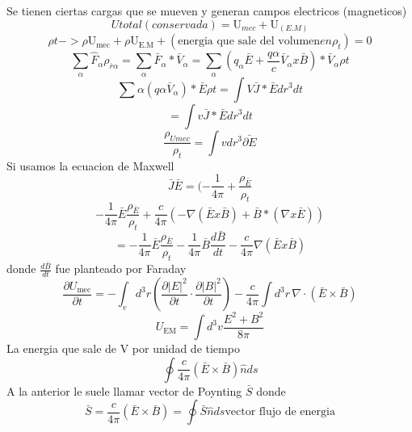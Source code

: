 \documentclass{article}
\begin{document}
	Se tienen ciertas cargas que se mueven y generan campos electricos (magneticos)
	\begin{equation*}
		U total (conservada)= \text{U}_{mec} + \text{U}_(E.M)
	\end{equation*}
	\begin{equation*}
		\rho t -> \rho \text{U}_{\text{mec}} + \rho \text{U}_{\text{E.M}} + (\text{energia que sale del volumen} en \rho_{t}) =0
	\end{equation*}
	\begin{equation*}
		\sum_{\alpha} \hat{F}_{\alpha} \rho_{\bar{r}\alpha}= \sum_{\alpha} \bar{F}_{\alpha} * \bar{V}_{\alpha}= \sum_{\alpha} (q_{\alpha} \bar{E} + \frac{q\alpha}{c} \bar{V}_{\alpha}x\bar{B})*\bar{V}_{\alpha} \rho t
	\end{equation*}
	\begin{equation*}
		\sum{\alpha} (q\alpha \bar{V}_{\alpha})*\bar{E} \rho t= \int{V} \bar{J} *\bar{E} dr^3 dt
	\end{equation*}
	\begin{equation*}
		= \int{v} \bar{J}*\bar{E} dr^3 dt
	\end{equation*}
	\begin{equation*}
		\frac{\rho_{Umec}}{\rho_{t}}=\int{v} dr^3 \bar{\partial E}
	\end{equation*}
	Si usamos la ecuacion de Maxwell
	\begin{equation*}
		\bar{J}\bar{E} = (-\frac{1}{4\pi}+\frac{\rho_{\bar{E}}}{\rho_{t}}
	\end{equation*}
	\begin{equation*}
		-\frac{1}{4\pi}\bar{E}\frac{\rho_{\bar{E}}}{\rho_{t}}  + \frac{c}{4\pi}(- \nabla (\bar{E}x\bar{B})+ \bar{B}*(\nabla x \bar{E}))
	\end{equation*}
	\begin{equation*}
		= -\frac{1}{4\pi}\bar{E}\frac{\rho_{\bar{E}}}{\rho_{t}} -\frac{1}{4\pi}\bar{B}\frac{d\bar{B}}{dt}-\frac{c}{4\pi}\nabla(\bar{E}x\bar{B})
	\end{equation*}
	donde \(\frac{d\bar{B}}{dt}\) fue planteado por Faraday
	\begin{equation}
		\frac{\partial U_{\text{mec}}}{\partial t} = - \int_{v} d^3r \left( \frac{\partial |E|^2}{\partial t} \cdot \frac{\partial |B|^2}{\partial t} \right) - \frac{c}{4\pi} \int d^3r \, \nabla \cdot \left( \bar{E} \times \bar{B} \right)
	\end{equation}
	\begin{equation*}
		U_{\text{EM}}= \int d^3v \frac{E^2 +B^2}{8\pi}
	\end{equation*}
	La energia que sale de V por unidad de tiempo
	\begin{equation*}
		\oint \frac{c}{4\pi}(\bar{E}\times\bar{B})\hat{n}ds
	\end{equation*}
	A la anterior le suele llamar vector de Poynting \(\bar{S}\)
	donde
	\begin{equation}
		\bar{S}=\frac{c}{4\pi}(\bar{E}\times\bar{B})= \oint \bar{S}\hat{n}ds \text{vector flujo de energia}
	\end{equation}
\end{document}
